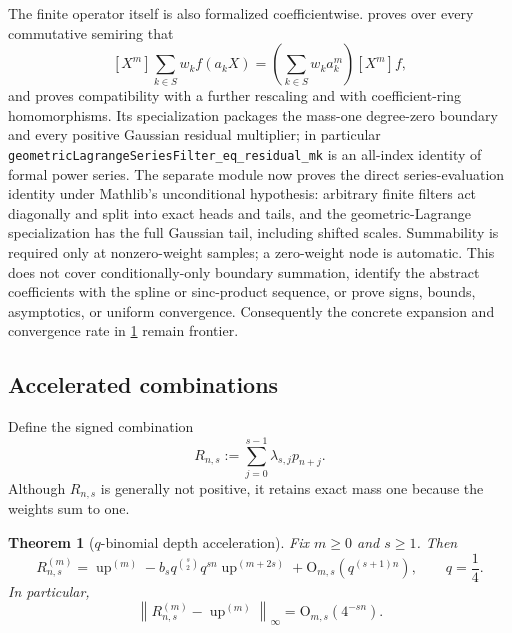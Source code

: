 \documentclass[11pt]{article}
\numberwithin{equation}{section}
\newtheorem{theorem}{Theorem}[section]
\theoremstyle{definition}
\theoremstyle{remark}
\newcommand{\Up}{\operatorname{up}}
\newcommand{\Oh}{\mathrm O}
\newcommand{\norm}[1]{\left\lVert#1\right\rVert}
\begin{document}
The finite operator itself is also formalized coefficientwise.
 proves over every commutative semiring
that
\[
 [X^m]\sum_{k\in S}w_k f(a_kX)
 =\left(\sum_{k\in S}w_ka_k^m\right)[X^m]f,
\]
and proves compatibility with a further rescaling and with coefficient-ring
homomorphisms.  Its specialization 
packages the mass-one degree-zero boundary and every positive Gaussian
residual multiplier; in particular
\nolinkurl{geometricLagrangeSeriesFilter_eq_residual_mk} is an all-index
identity of formal power series.  The separate module
 now proves the direct series-evaluation
identity under Mathlib's unconditional  hypothesis: arbitrary
finite filters act diagonally and split into exact heads and tails, and the
geometric-Lagrange specialization has the full Gaussian tail, including shifted
scales.  Summability is required only at nonzero-weight samples; a zero-weight
node is automatic.  This does not cover conditionally-only boundary summation,
identify the abstract coefficients with the spline or sinc-product sequence,
or prove signs, bounds, asymptotics, or uniform convergence.  Consequently the
concrete expansion and convergence rate in \cref{p1:thm:q-richardson} remain
frontier.

\subsection{Accelerated combinations}

Define the signed combination
\begin{equation}
 R_{n,s}:=\sum_{j=0}^{s-1}\lambda_{s,j}p_{n+j}.
 \label{p1:eq:Rns}
\end{equation}
Although $R_{n,s}$ is generally not positive, it retains exact mass one because the weights sum to one.

\begin{theorem}[$q$-binomial depth acceleration]
\label{p1:thm:q-richardson}
Fix $m\ge0$ and $s\ge1$.  Then
\begin{equation}
 \boxed{
 R_{n,s}^{(m)}
 =\Up^{(m)}
 -b_sq^{\binom s2}q^{sn}\Up^{(m+2s)}
 +\Oh_{m,s}(q^{(s+1)n}),
 \qquad q=\frac14.}
 \label{p1:eq:q-richardson-asymptotic}
\end{equation}
In particular,
\begin{equation}
 \norm{R_{n,s}^{(m)}-\Up^{(m)}}_\infty=\Oh_{m,s}(4^{-sn}).
 \label{p1:eq:q-richardson-rate}
\end{equation}
\end{theorem}
\end{document}
